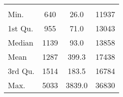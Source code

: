 \begin{tabular}{lS[table-format=5.1]S[table-format=5.1]S[table-format=5.1]}
&  &  &  \\
 Min.    & 640 & 26.0 & 11937 \\
 1st Qu. & 955 & 71.0 & 13043 \\
 Median  & 1139 & 93.0 & 13858 \\
 Mean    & 1287 & 399.3 & 17438 \\
 3rd Qu. & 1514 & 183.5 & 16784 \\
 Max.    & 5033 & 3839.0 & 36830 \\
\end{tabular}
